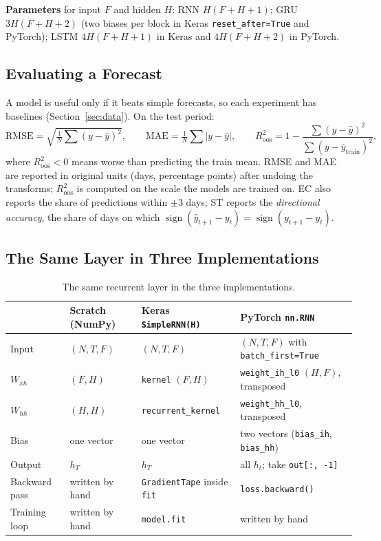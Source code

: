 \documentclass[11pt, a4paper]{article}
\begin{document}
\textbf{Parameters} for input $F$ and hidden $H$: RNN $H(F+H+1)$; GRU $3H(F+H+2)$ (two biases per block in Keras \texttt{reset\_after=True} and PyTorch); LSTM $4H(F+H+1)$ in Keras and $4H(F+H+2)$ in PyTorch.

\subsection{Evaluating a Forecast}
\label{sec:eval}

A model is useful only if it beats simple forecasts, so each experiment has baselines (Section~\ref{sec:data}). On the test period:
\begin{equation}
\mathrm{RMSE}=\sqrt{\tfrac1N\textstyle\sum(y-\hat y)^2},\qquad \mathrm{MAE}=\tfrac1N\textstyle\sum|y-\hat y|,\qquad R^2_{\text{oos}}=1-\frac{\sum(y-\hat y)^2}{\sum(y-\bar y_{\text{train}})^2},
\end{equation}
where $R^2_{\text{oos}}<0$ means worse than predicting the train mean. RMSE and MAE are reported in original units (days, percentage points) after undoing the transforms;
$R^2_{\text{oos}}$ is computed on the scale the models are trained on. EC also reports the share of predictions within $\pm3$ days; ST reports the \emph{directional accuracy},
the share of days on which $\operatorname{sign}(\hat y_{t+1}-y_t)=\operatorname{sign}(y_{t+1}-y_t)$.

\subsection{The Same Layer in Three Implementations}
\label{sec:three}

\begin{table}[H]
\centering
\caption{The same recurrent layer in the three implementations.}
\label{tab:mapping}
\small
\begin{tabularx}{\textwidth}{lXXX}
\toprule
 & Scratch (NumPy) & Keras \texttt{SimpleRNN(H)} & PyTorch \texttt{nn.RNN} \\
\midrule
Input & $(N,T,F)$ & $(N,T,F)$ & $(N,T,F)$ with \texttt{batch\_first=True} \\
$W_{xh}$ & $(F,H)$ & \texttt{kernel} $(F,H)$ & \texttt{weight\_ih\_l0} $(H,F)$, transposed \\
$W_{hh}$ & $(H,H)$ & \texttt{recurrent\_kernel} & \texttt{weight\_hh\_l0}, transposed \\
Bias & one vector & one vector & two vectors (\texttt{bias\_ih}, \texttt{bias\_hh}) \\
Output & $h_T$ & $h_T$ & all $h_t$; take \texttt{out[:, -1]} \\
Backward pass & written by hand & \texttt{GradientTape} inside \texttt{fit} & \texttt{loss.backward()} \\
Training loop & written by hand & \texttt{model.fit} & written by hand \\
\bottomrule
\end{tabularx}
\end{table}
\end{document}
